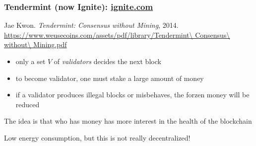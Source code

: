 \documentclass[11pt]{beamer}  %
\begin{document}
\begin{frame}\frametitle{Tendermint (now Ignite): \url{ignite.com}}

  \begin{greenbox}{Jae Kwon. \emph{Tendermint: Consensus without Mining}, 2014.\\
    \url{https://www.weusecoins.com/assets/pdf/library/Tendermint\ Consensus\ without\ Mining.pdf}}
    \begin{itemize}
    \item only a set $V$ of \emph{validators} decides the next block
    \item to become validator, one must stake a large amount of money
    \item if a validator produces illegal blocks or misbehaves, the forzen money will be reduced
    \end{itemize}
  \end{greenbox}

  \smallskip

  \begin{center}
    The idea is that who has money has more interest in the health of the blockchain
  \end{center}

  \smallskip

  \begin{center}
    Low energy consumption, but this is not really decentralized!
  \end{center}

\end{frame}
\end{document}
